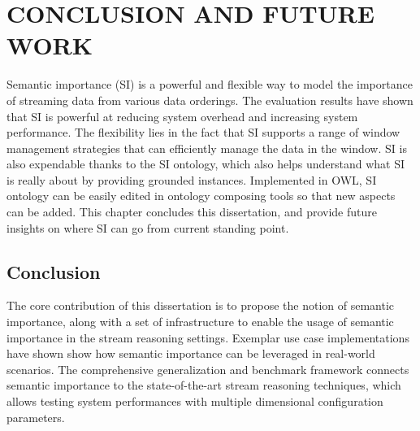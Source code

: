  
\chapter{CONCLUSION AND FUTURE WORK}
Semantic importance (SI) is a powerful and flexible way to model the importance of streaming data from various data orderings.
The evaluation results have shown that SI is powerful at reducing system overhead and increasing system performance. 
The flexibility lies in the fact that SI supports a range of window management strategies that can efficiently manage the data in the window. 
SI is also expendable thanks to the SI ontology, which also helps understand what SI is really about by providing grounded instances.
Implemented in OWL, SI ontology can be easily edited in ontology composing tools so that new aspects can be added. 
This chapter concludes this dissertation, and provide future insights on where SI can go from current standing point. 
%
\section{Conclusion}
The core contribution of this dissertation is to propose the notion of semantic importance, along with a set of infrastructure to enable the usage of semantic importance in the stream reasoning settings.
Exemplar use case implementations have shown show how semantic importance can be leveraged in real-world scenarios.
The comprehensive generalization and benchmark framework connects semantic importance to the state-of-the-art stream reasoning techniques, which allows testing system performances with multiple dimensional configuration parameters.

